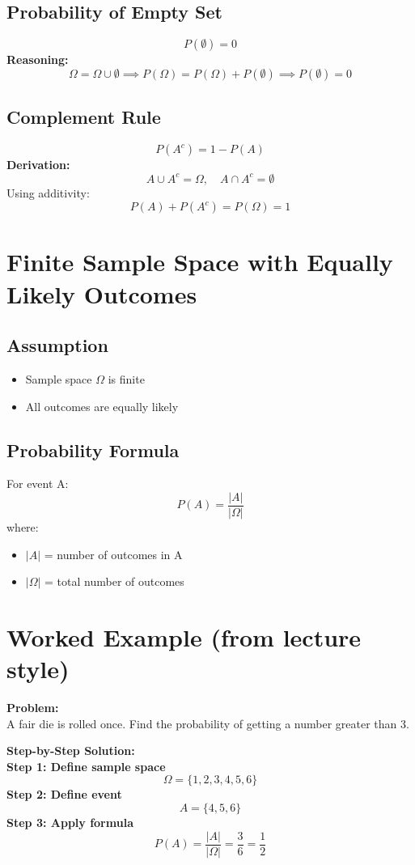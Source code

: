 \documentclass[11pt]{article}
\begin{document}
\subsection{Probability of Empty Set}
\[ P(\emptyset) = 0 \]
\textbf{Reasoning:}
\[ \Omega = \Omega \cup \emptyset \implies P(\Omega) = P(\Omega) + P(\emptyset) \implies P(\emptyset) = 0 \]

\subsection{Complement Rule}
\[ P(A^c) = 1 - P(A) \]
\textbf{Derivation:}
\[ A \cup A^c = \Omega, \quad A \cap A^c = \emptyset \]
Using additivity:
\[ P(A) + P(A^c) = P(\Omega) = 1 \]

\section{Finite Sample Space with Equally Likely Outcomes}

\subsection{Assumption}
\begin{itemize}
    \item Sample space $\Omega$ is finite
    \item All outcomes are equally likely
\end{itemize}

\subsection{Probability Formula}
For event A:
\[ P(A) = \frac{|A|}{|\Omega|} \]
where:
\begin{itemize}
    \item $|A|$ = number of outcomes in A
    \item $|\Omega|$ = total number of outcomes
\end{itemize}

\section{Worked Example (from lecture style)}
\textbf{Problem:} \\
A fair die is rolled once. Find the probability of getting a number greater than 3.

\textbf{Step-by-Step Solution:} \\
\textbf{Step 1: Define sample space}
\[ \Omega = \{1, 2, 3, 4, 5, 6\} \]
\textbf{Step 2: Define event}
\[ A = \{4, 5, 6\} \]
\textbf{Step 3: Apply formula}
\[ P(A) = \frac{|A|}{|\Omega|} = \frac{3}{6} = \frac{1}{2} \]
\end{document}
